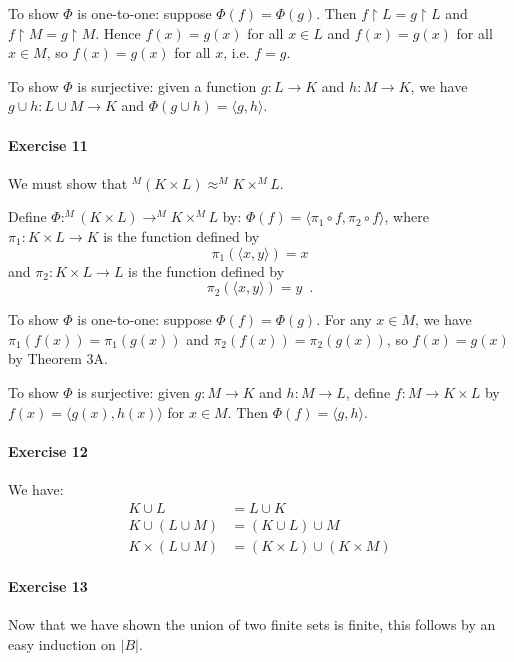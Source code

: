 \documentclass{report}
\begin{document}
    To show $\Phi$ is one-to-one: suppose $\Phi(f) = \Phi(g)$. Then $f \restriction L = g \restriction L$
    and $f \restriction M = g \restriction M$. Hence $f(x) = g(x)$ for all $x \in L$ and $f(x) = g(x)$
    for all $x \in M$, so $f(x) = g(x)$ for all $x$, i.e. $f = g$.

    To show $\Phi$ is surjective: given a function $g : L \rightarrow K$ and $h : M \rightarrow K$,
    we have $g \cup h : L \cup M \rightarrow K$ and $\Phi(g \cup h) = \langle g, h \rangle$.

    \paragraph{Exercise 11}
    We must show that $^M(K \times L) \approx ^M K \times ^M L$.

    Define $\Phi : ^M(K \times L) \rightarrow ^M K \times ^M L$ by: $\Phi(f) = \langle \pi_1 \circ f,
    \pi_2 \circ f \rangle$, where $\pi_1 : K \times L \rightarrow K$ is the function defined by
    \[ \pi_1(\langle x,y \rangle) = x \]
    and $\pi_2 : K \times L \rightarrow L$ is the function defined by
    \[ \pi_2(\langle x,y \rangle) = y \enspace . \]

    To show $\Phi$ is one-to-one: suppose $\Phi(f) = \Phi(g)$. For any $x \in M$, we have $\pi_1(f(x)) = \pi_1(g(x))$
    and $\pi_2(f(x)) = \pi_2(g(x))$, so $f(x) = g(x)$ by Theorem 3A.

    To show $\Phi$ is surjective: given $g : M \rightarrow K$ and $h : M \rightarrow L$,
    define $f : M \rightarrow K \times L$ by $f(x) = \langle g(x), h(x) \rangle$ for $x \in M$.
    Then $\Phi(f) = \langle g, h \rangle$.

    \paragraph{Exercise 12}
    We have:
    \begin{align*}
        K \cup L & = L \cup K \\
        K \cup (L \cup M) & = (K \cup L) \cup M \\
        K \times (L \cup M) & = (K \times L) \cup (K \times M)
    \end{align*}

    \paragraph{Exercise 13}
    Now that we have shown the union of two finite sets is finite, this follows by an easy induction on
    $|B|$.
    
\end{document}
